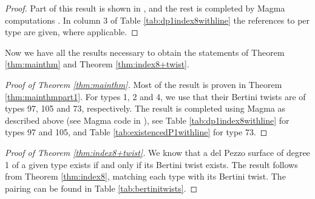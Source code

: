\documentclass[a4paper, 11pt, reqno]{amsart}
\numberwithin{equation}{section} \numberwithin{figure}{section}
\theoremstyle{definition}
\numberwithin{lemma}{section}
\begin{document}
\begin{proof}
    Part of this result is shown in \cite{BFL}, and the rest is completed by Magma computations \cite{github_Existence_dP1}. In column 3 of Table \ref{tab:dp1index8withline} the references to \cite{BFL} per type are given, where applicable.
\end{proof}

Now we have all the results necessary to obtain the statements of Theorem \ref{thm:mainthm} and Theorem \ref{thm:index8+twist}.

\begin{proof}[Proof of Theorem \ref{thm:mainthm}]
    Most of the result is proven in Theorem \ref{thm:mainthmpart1}. For types 1, 2 and 4, we use that their Bertini twists are of types 97, 105 and 73, respectively. The result is completed using Magma as described above (see Magma code in \cite{github_Existence_dP1}), see Table \ref{tab:dp1index8withline} for types 97 and 105, and Table \ref{tab:existencedP1withline} for type 73.
\end{proof}

\begin{proof}[Proof of Theorem \ref{thm:index8+twist}]
    We know that a del Pezzo surface of degree 1 of a given type exists if and only if its Bertini twist exists. The result follows from Theorem \ref{thm:index8}, matching each type with its Bertini twist. The pairing can be found in Table \ref{tab:bertinitwists}.
\end{proof}

\end{document}

